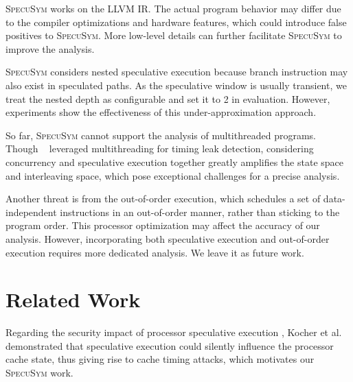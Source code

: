 \documentclass[sigconf,screen]{acmart}
\newcommand\ignore[1]{}
\newcommand{\SpecuSym}{\textsc{SpecuSym} }
\begin{document}
\SpecuSym works on the LLVM IR. The actual program behavior may differ due 
to the compiler optimizations and hardware features, which could introduce
false positives to \textsc{SpecuSym}. More low-level details can further 
facilitate \SpecuSym to improve the analysis.


\SpecuSym considers nested speculative execution because branch instruction 
may also exist in speculated paths. As the speculative window is usually 
transient, we treat the nested depth as configurable and set it to 2 in 
evaluation. However, experiments show the effectiveness of this 
under-approximation approach.
	

So far, \SpecuSym cannot support the analysis of multithreaded programs. Though 
{}~\cite{GuoWW18} leveraged multithreading for timing leak detection, 
considering concurrency and speculative execution together greatly amplifies 
the state space and interleaving space, which pose exceptional challenges for a 
precise analysis.


Another threat is from the out-of-order execution, which schedules a set of 
data-independent instructions in an out-of-order manner, rather than sticking 
to the program order. This processor optimization may affect the accuracy of 
our analysis. However, incorporating both speculative execution and out-of-order 
execution requires more dedicated analysis. We leave it as future work. 


\ignore{
We do not consider the situation that speculative execution leverages Branch 
Target Buffer (BTB) or Return Stack Buffer (RSB) to select the destinations 
of indirect branches. Such vulnerabilities have been effectively mitigated 
by Intel and AMD through Indirect Branch Prediction Barrier (IBPB) settings.
}

\section{Related Work}
\label{sec:related}

Regarding the security impact of processor speculative execution
\cite{kimuraKT1996}, Kocher et al.~\cite{KocherGGHHLMPSY19} demonstrated 
that speculative execution could silently influence the processor cache 
state, thus giving rise to cache timing attacks, which motivates our 
\textsc{SpecuSym} work. 
\end{document}
